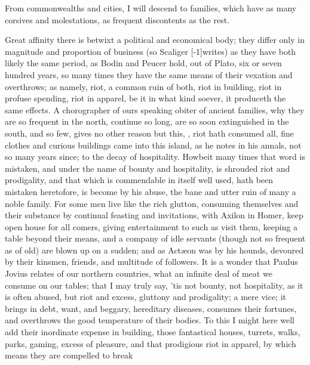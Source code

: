 {From commonwealths and cities, I will descend to families, which have
as many corsives and molestations, as frequent discontents as the rest.

Great affinity there is betwixt a political and economical body; they
differ only in magnitude and proportion of business (so Scaliger
[-1\baselineskip]writes) as they have both likely the same period, as Bodin
and Peucer hold, out of Plato, six or seven hundred years, so many
times they have the same means of their vexation and overthrows; as
namely, riot, a common ruin of both, riot in building, riot in profuse
spending, riot in apparel, \etc{} be it in what kind soever, it produceth
the same effects. A chorographer of ours speaking obiter of
ancient families, why they are so frequent in the north, continue so
long, are so soon extinguished in the south, and so few, gives no other
reason but this, , riot hath consumed all, fine
clothes and curious buildings came into this island, as he notes in his
annals, not so many years since;  to
the decay of hospitality. Howbeit many times that word is mistaken, and
under the name of bounty and hospitality, is shrouded riot and
prodigality, and that which is commendable in itself well used, hath
been mistaken heretofore, is become by his abuse, the bane and utter
ruin of many a noble family. For some men live like the rich glutton,
consuming themselves and their substance by continual feasting and
invitations, with Axilon in Homer, keep open house for all comers,
giving entertainment to such as visit them, keeping a table beyond
their means, and a company of idle servants (though not so frequent as
of old) are blown up on a sudden; and as Act\ae{}on was by his hounds,
devoured by their kinsmen, friends, and multitude of followers. It
is a wonder that Paulus Jovius relates of our northern countries, what
an infinite deal of meat we consume on our tables; that I may truly
say, 'tis not bounty, not hospitality, as it is often abused, but riot
and excess, gluttony and prodigality; a mere vice; it brings in debt,
want, and beggary, hereditary diseases, consumes their fortunes, and
overthrows the good temperature of their bodies. To this I might here
well add their inordinate expense in building, those fantastical
houses, turrets, walks, parks, \etc{} gaming, excess of pleasure, and that
prodigious riot in apparel, by which means they are compelled to break
}
